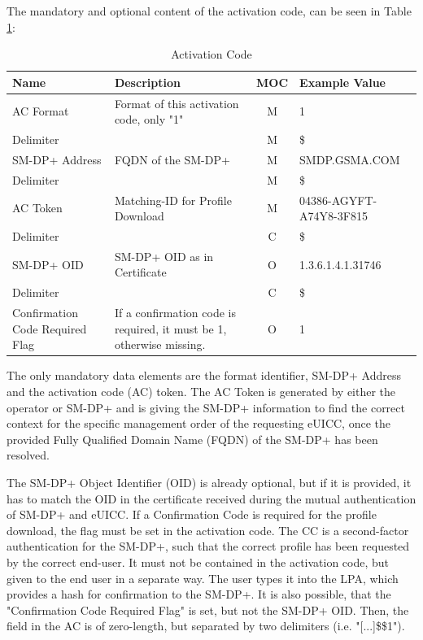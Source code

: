 The mandatory and optional content of the activation code, can be seen in Table \ref{tab:ConAC}:

\begin{table}[htpb]
    \caption[Activation Code]{Activation Code}\label{tab:ConAC}
    \centering
    \begin{tabular}{m{3cm}|m{6cm}|c|m{3cm}}
         Name & Description & MOC & Example Value\\ \hline
         AC Format & Format of this activation code, only "1" & M & 1 \\ \hline
         Delimiter & & M & \$ \\ \hline
         SM-DP+ Address & FQDN of the SM-DP+ & M & SMDP.GSMA.COM \\ \hline
         Delimiter & & M & \$ \\ \hline
         AC Token & Matching-ID for Profile Download & M & 04386-AGYFT-A74Y8-3F815 \\ \hline
         Delimiter & & C & \$ \\ \hline
         SM-DP+ OID & SM-DP+ OID as in Certificate & O & 1.3.6.1.4.1.31746 \\ \hline
         Delimiter & & C & \$ \\ \hline
         Confirmation Code Required Flag & If a confirmation code is required, it must be 1, otherwise missing. & O & 1
    \end{tabular}
\end{table}
The only mandatory data elements are the format identifier, SM-DP+ Address and the activation code (AC) token. The AC Token is generated by either the operator or SM-DP+ and is giving the SM-DP+ information to find the correct context for the specific management order of the requesting eUICC, once the provided Fully Qualified Domain Name (FQDN) of the SM-DP+ has been resolved. 

The SM-DP+ Object Identifier (OID) is already optional, but if it is provided, it has to match the OID in the certificate received during the mutual authentication of SM-DP+ and eUICC.
If a Confirmation Code is required for the profile download, the flag must be set in the activation code. The CC is a second-factor authentication for the SM-DP+, such that the correct profile has been requested by the correct end-user. It must not be contained in the activation code, but given to the end user in a separate way. The user types it into the LPA, which provides a hash for confirmation to the SM-DP+.
It is also possible, that the "Confirmation Code Required Flag" is set, but not the SM-DP+ OID. Then, the field in the AC is of zero-length, but separated by two delimiters (i.e. "[...]\$\$1").


